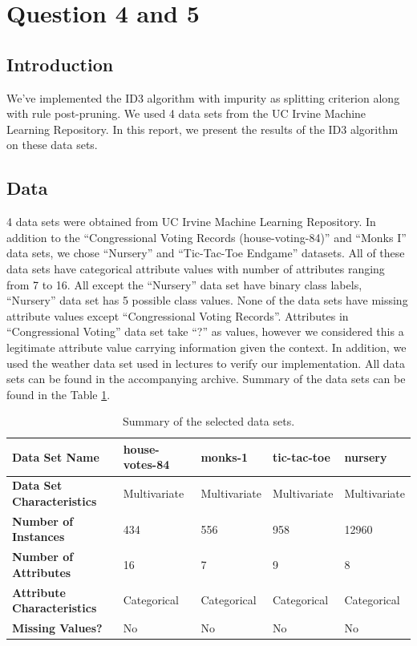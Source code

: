 \documentclass[12pt]{article}
\begin{document}
\section{Question 4 and 5}

\subsection{Introduction}
We've implemented the ID3 algorithm with impurity as splitting
criterion along with rule post-pruning. We used 4 data sets from the
UC Irvine Machine Learning Repository. In this report, we present the
results of the ID3 algorithm on these data sets.

\subsection{Data}
4 data sets were obtained from UC Irvine Machine Learning
Repository. In addition to the ``Congressional Voting Records
(house-voting-84)'' and ``Monks I'' data sets, we chose ``Nursery''
and ``Tic-Tac-Toe Endgame'' datasets. All of these data sets have
categorical attribute values with number of attributes ranging from 7
to 16. All except the ``Nursery'' data set have binary class labels,
``Nursery'' data set has 5 possible class values. None of the data
sets have missing attribute values except ``Congressional Voting
Records''. Attributes in ``Congressional Voting'' data set take ``?''
as values, however we considered this a legitimate attribute value
carrying information given the context. In addition, we used the
weather data set used in lectures to verify our implementation.  All
data sets can be found in the accompanying archive. Summary of the
data sets can be found in the Table \ref{table:datasetsummary}.

\begin{table}[H]
  \centering
  \begin{small}
    \begin{tabular}{|l|l|l|l|l|}
      \hline
      \textbf{Data Set Name}             & house-votes-84 & monks-1      & tic-tac-toe  & nursery      \\ \hline
      \textbf{Data Set Characteristics}  & Multivariate   & Multivariate & Multivariate & Multivariate \\ \hline
      \textbf{Number of Instances}       & 434            & 556          & 958          & 12960        \\ \hline
      \textbf{Number of Attributes}      & 16             & 7            & 9            & 8            \\ \hline
      \textbf{Attribute Characteristics} & Categorical    & Categorical  & Categorical  & Categorical  \\ \hline
      \textbf{Missing Values?}           & No             & No           & No           & No           \\ \hline
    \end{tabular}
  \end{small}
  \caption{Summary of the selected data sets.}
  \label{table:datasetsummary}
\end{table}
\end{document}
